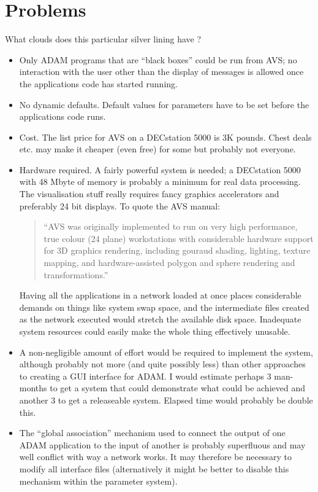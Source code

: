 \section{Problems}

What clouds does this particular silver lining have ?
\begin{itemize}

\item Only ADAM programs that are ``black boxes'' could be run from AVS; no
  interaction with the user other than the display of messages is allowed once
  the applications code has started running.

\item No dynamic defaults. Default values for parameters have to be set before
  the applications code runs.

\item Cost. The list price for AVS on a DECstation 5000 is 3K pounds. Chest deals
  etc. may make it cheaper (even free) for some but probably not everyone.

\item Hardware required. A fairly powerful system is needed; a DECstation 5000
  with 48 Mbyte of memory is probably a minimum for real data processing. The
  visualisation stuff really requires fancy graphics accelerators and
  preferably 24 bit displays. To quote the AVS manual:
\begin{quote}
	``AVS was originally implemented to run on very high performance,
	true colour (24 plane) workstations with considerable hardware
	support for 3D graphics rendering, including gouraud shading, 
	lighting, texture mapping, and hardware-assisted polygon and 
	sphere rendering and transformations.''
\end{quote}
  Having all the applications in a network loaded at once places
  considerable demands on things like system swap space, and the intermediate
  files created as the network executed would stretch the available disk space.
  Inadequate system resources could easily make the whole thing effectively 
  unusable.

\item A non-negligible amount of effort would be required to implement the system,
  although probably not more (and quite possibly less) than other approaches to
  creating a GUI interface for ADAM. I would estimate perhaps 3 man-months to
  get a system that could demonstrate what could be achieved and another 3 to 
  get a releaseable system. Elapsed time would probably be double this.

\item The ``global association'' mechanism used to connect the output of one ADAM
  application to the input of another is probably superfluous and may well
  conflict with way a network works. It may therefore be necessary to modify 
  all interface files (alternatively it might be better to disable this 
  mechanism within the parameter system).

\end{itemize}

